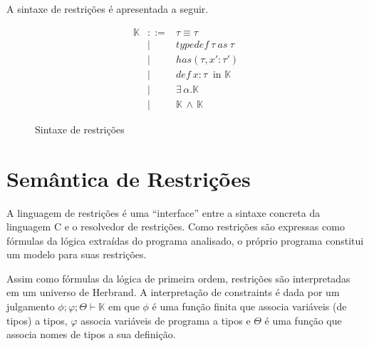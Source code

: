 \documentclass[a4paper,8pt]{article}
\begin{document}
     A sintaxe de restrições é apresentada a seguir. 

     \begin{figure}[h]
        \[
             \begin{array}{lcl}
                 \mathbb{K} & ::= & \tau \equiv \tau \\
                                    & \mid & typedef\:\tau\:as\:\tau \\
                                    & \mid & has(\tau, x' : \tau') \\
                                    & \mid & def\:x:\tau\:\text{ in
                                             }\mathbb{K}\\
                                    & \mid &
                                             \exists\,\alpha.\mathbb{K}\\
                                    & \mid & \mathbb{K}\,\land\,\mathbb{K}
             \end{array}
        \]
        \centering
        \caption{Sintaxe de restrições}
        \label{figconstrsyn}
      \end{figure}

     \section{Semântica de Restrições}\label{semantics}

     A linguagem de restrições é uma ``interface'' entre a sintaxe
     concreta da linguagem C e o resolvedor de restrições. Como
     restrições são expressas como fórmulas da lógica extraídas do 
     programa analisado, o próprio programa constitui um modelo 
     para suas restrições.

     Assim como fórmulas da lógica de primeira ordem, restrições são
     interpretadas em um universo de Herbrand. A interpretação de
     constraints é dada por um julgamento 
     $\phi ; \varphi ; \Theta \vdash \mathbb{K}$ em que $\phi$ é uma
     função finita que associa variáveis (de tipos) a tipos, $\varphi$
     associa variáveis de programa a tipos e $\Theta$ é uma função
     que associa nomes de tipos a sua definição.
\end{document}
